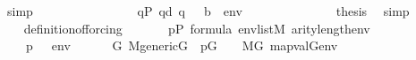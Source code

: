\begin{isabellebody}
\ simp\isanewline
\ \ \ \ \ \ \isamarkupfalse%
\ \isanewline
\ \ \ \ \ \ \isamarkupfalse%
\ {\isacartoucheopen}{\isasymforall}q{\isasymin}P{\isachardot}{\kern0pt}\ q{\isasympreceq}d\ {\isasymlongrightarrow}{\isasymnot}{\isacharparenleft}{\kern0pt}q\ {\isasymtturnstile}\ {\isasymphi}\ {\isacharparenleft}{\kern0pt}{\isacharbrackleft}{\kern0pt}b{\isacharbrackright}{\kern0pt}\ {\isacharat}{\kern0pt}\ env{\isacharparenright}{\kern0pt}{\isacharparenright}{\kern0pt}{\isacartoucheclose}\isanewline
\ \ \ \ \ \ \isamarkupfalse%
\isanewline
\ \ \ \ \ \ \isamarkupfalse%
\ {\isacharquery}{\kern0pt}thesis\ \isamarkupfalse%
\ simp\isanewline
\ \ \ \ \isamarkupfalse%
\isanewline
\ \ \isamarkupfalse%
\isanewline
{}\isamarkupfalse%
%
\endisatagproof
{\isafoldproof}%
%
\isadelimproof
%
\endisadelimproof
%
\isadelimdocument
%
\endisadelimdocument
%
\isatagdocument
%
\isamarkuptrue%
%
\endisatagdocument
{\isafolddocument}%
%
\isadelimdocument
%
\endisadelimdocument
{}\isamarkupfalse%
\ definition{\isacharunderscore}{\kern0pt}of{\isacharunderscore}{\kern0pt}forcing{\isacharcolon}{\kern0pt}\isanewline
\ \ \isanewline
\ \ \ \ {\isachardoublequoteopen}p{\isasymin}P{\isachardoublequoteclose}\ {\isachardoublequoteopen}{\isasymphi}{\isasymin}formula{\isachardoublequoteclose}\ {\isachardoublequoteopen}env{\isasymin}list{\isacharparenleft}{\kern0pt}M{\isacharparenright}{\kern0pt}{\isachardoublequoteclose}\ {\isachardoublequoteopen}arity{\isacharparenleft}{\kern0pt}{\isasymphi}{\isacharparenright}{\kern0pt}{\isasymle}length{\isacharparenleft}{\kern0pt}env{\isacharparenright}{\kern0pt}{\isachardoublequoteclose}\isanewline
\ \ \isanewline
\ \ \ \ {\isachardoublequoteopen}{\isacharparenleft}{\kern0pt}p\ {\isasymtturnstile}\ {\isasymphi}\ env{\isacharparenright}{\kern0pt}\ {\isasymlongleftrightarrow}\isanewline
\ \ \ \ \ {\isacharparenleft}{\kern0pt}{\isasymforall}G{\isachardot}{\kern0pt}\ M{\isacharunderscore}{\kern0pt}generic{\isacharparenleft}{\kern0pt}G{\isacharparenright}{\kern0pt}\ {\isasymand}\ p{\isasymin}G\ \ {\isasymlongrightarrow}\ \ M{\isacharbrackleft}{\kern0pt}G{\isacharbrackright}{\kern0pt}{\isacharcomma}{\kern0pt}\ map{\isacharparenleft}{\kern0pt}val{\isacharparenleft}{\kern0pt}G{\isacharparenright}{\kern0pt}{\isacharcomma}{\kern0pt}env{\isacharparenright}{\kern0pt}\ {\isasymTurnstile}\ {\isasymphi}{\isacharparenright}{\kern0pt}{\isachardoublequoteclose}\isanewline

\end{isabellebody}
